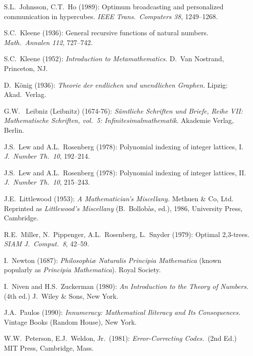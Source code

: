 \begin{thebibliography}{999}
S.L.~Johnsson, C.T.~Ho (1989):
Optimum broadcasting and personalized communication in hypercubes.
{\it IEEE Trans.~Computers 38}, 1249--1268.



S.C.~Kleene (1936): General recursive functions of natural numbers.
{\it Math.~Annalen 112}, 727--742.

S.C.~Kleene (1952):
{\it Introduction to Metamathematics.}
D.~Van Nostrand, Princeton, NJ.

D.~K\"onig (1936):
{\it Theorie der endlichen und unendlichen Graphen.}  Lipzig: Akad.~Verlag.



G.W.~ Leibniz (Leibnitz) (1674-76):
{\it S\"{a}mtliche Schriften und Briefe, Reihe VII: Mathematische
  Schriften, vol.~5: Infinitesimalmathematik}.
Akademie Verlag, Berlin.

J.S.~Lew and A.L.~Rosenberg (1978): Polynomial indexing of integer
lattices, I.  {\it J.~Number Th.~10}, 192--214.
 
J.S.~Lew and A.L.~Rosenberg (1978): Polynomial indexing of integer
lattices, II.  {\it J.~Number Th.~10}, 215--243.

J.E.~Littlewood (1953):
{\it A Mathematician's Miscellany.}
Methuen \& Co, Ltd.
Reprinted as {\it Littlewood's Miscellany} (B.~Bollob\`{a}s, ed.),
1986, University Press, Cambridge.



R.E.~Miller, N.~Pippenger, A.L.~Rosenberg, L.~Snyder (1979): Optimal
2,3-trees.  {\it SIAM J.~Comput.~8}, 42--59.



I.~Newton (1687): {\it Philosophiæ Naturalis Principia Mathematica}
(known popularly as {\it Principia Mathematica}).
Royal Society.


I.~Niven and H.S.~Zuckerman (1980):
{\it An Introduction to the Theory of Numbers.} (4th ed.)
J.~Wiley \& Sons, New York.



J.A.~Paulos (1990):
{\it Innumeracy: Mathematical Iliteracy and Its Consequences.}
Vintage Books (Random House), New York.

W.W.~Peterson, E.J.~Weldon, Jr.~(1981):
{\it Error-Correcting Codes.}~(2nd Ed.)
MIT Press, Cambridge, Mass.



\end{thebibliography}
